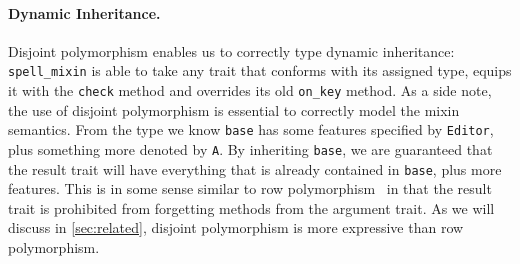 \paragraph{Dynamic Inheritance.}

Disjoint polymorphism enables us to correctly type dynamic inheritance:
\lstinline{spell_mixin} is able to take any trait that conforms with its
assigned type, equips it with the \lstinline{check} method and overrides its
old \lstinline{on_key} method. As a side note, the use of disjoint polymorphism
is essential to correctly model the mixin semantics. From the type we know
\lstinline{base} has some features specified by \lstinline{Editor}, plus
something more denoted by \lstinline{A}. By inheriting \lstinline{base}, we are
guaranteed that the result trait will have everything that is already contained
in \lstinline{base}, plus more features. This is in some sense similar to row
polymorphism~\cite{wand1994type} in that the result trait is prohibited from
forgetting methods from the argument trait. As we will discuss in
\cref{sec:related}, disjoint polymorphism is more expressive than row
polymorphism.


